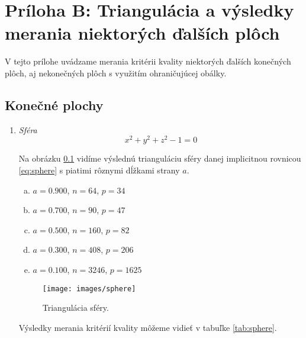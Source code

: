 \chapter*{Príloha B: Triangulácia a výsledky merania niektorých ďalších plôch}
\label{priloha:prilohaB}


\renewcommand{\arraystretch}{1}
\setlength{\fboxsep}{2mm} %
\setlength{\tabcolsep}{-4pt}

V tejto prílohe uvádzame merania kritérii kvality niektorých ďalších konečných plôch, 
aj nekonečných plôch s využitím ohraničujúcej obálky.

\newpage
\section{Konečné plochy}
\begin{enumerate}
\item{
    \textit{Sféra}
    \begin{equation}
    \label{eq:sphere}
    x^2 + y^2 + z^2 - 1 = 0
    \end{equation}

    Na obrázku \ref{obr:sphere} vidíme výslednú trianguláciu sféry danej implicitnou 
    rovnicou \ref{eq:sphere} s piatimi rôznymi dĺžkami strany $a$.
    \begin{enumerate}[a)]
    \item{
        $a=0.900$, $n=64$, $p=34$
    }
    \item{
        $a=0.700$, $n=90$, $p=47$
    }
    \item{
        $a=0.500$, $n=160$, $p=82$
    }
    \item{
        $a=0.300$, $n=408$, $p=206$
    }
    \item{
        $a=0.100$, $n=3246$, $p=1625$
    }
    \end{enumerate}

    \begin{figure}
        \centerline{\texttt{[image: images/sphere]}}
        \caption[Triangulácia sféry]{Triangulácia sféry.}
        \label{obr:sphere}
    \end{figure}

    Výsledky merania kritérií kvality môžeme vidieť v tabuľke \ref{tab:sphere}.
    
}
\end{enumerate}
